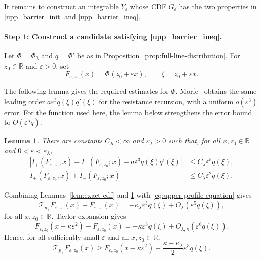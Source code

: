 \documentclass[12pt]{amsart}
\numberwithin{equation}{section}
\theoremstyle{plain}
\newtheorem{lemma}[theorem]{Lemma}
\theoremstyle{definition}
\newcommand{\R}{\mathbb R}
\begin{document}
It remains to construct an integrable $Y_\varepsilon$ whose CDF
$G_\varepsilon$ has the two properties in \eqref{upp_barrier_init}
and \eqref{upp_barrier_ineq}.

\paragraph*{Step 1: Construct a candidate satisfying \eqref{upp_barrier_ineq}.}
 Let
$\Phi=\Phi_{\lambda}$ and $q=\Phi'$ be as in
Proposition~\ref{prop:full-line-distribution}.  For $z_0\in\mathbb R$
and $\varepsilon>0$, set
\[
 F_{\varepsilon,z_0}(x)=\Phi(z_0+\varepsilon x),
 \qquad
 \xi=z_0+\varepsilon x.
\]

The following lemma gives the
required estimates for $\Phi$. Morfe~\cite[Proposition~10]{Morfe2026} obtains the same leading order $a\varepsilon^3q(\xi)q'(\xi)$ for the resistance recursion, with a  uniform $o(\varepsilon^3)$ error.  For the function used here, the lemma below strengthens the error bound to $O(\varepsilon^5q)$.
\begin{lemma}
\label{lem:weighted-consistency}
There are constants $C_\lambda<\infty$ and $\varepsilon_\lambda>0$
such that, for all $x,z_0\in\mathbb R$ and
$0<\varepsilon<\varepsilon_\lambda$,
\begin{align}
 \left|I_+(F_{\varepsilon,z_0};x)-I_-(F_{\varepsilon,z_0};x)
       -a\varepsilon^3q(\xi)q'(\xi)\right|
 &\le C_\lambda\varepsilon^5q(\xi),
 \label{eq:weighted-difference}\\
 I_+(F_{\varepsilon,z_0};x)+I_-(F_{\varepsilon,z_0};x)
 &\le C_\lambda\varepsilon^2q(\xi).
 \label{eq:weighted-sum}
\end{align}
\end{lemma}

Combining Lemmas~\ref{lem:exact-cdf} and
\ref{lem:weighted-consistency} with
\eqref{eq:upper-profile-equation} gives
\begin{equation*}
 \mathcal T_{p_+}F_{\varepsilon,z_0}(x)
 -F_{\varepsilon,z_0}(x)
 =-\kappa_{\lambda}\varepsilon^3q(\xi)
  +O_{\lambda}(\varepsilon^5q(\xi)),
\end{equation*}
for all $x,z_0\in\R$.  Taylor expansion gives
\begin{equation*}
 F_{\varepsilon,z_0}(x-\kappa\varepsilon^2)
 -F_{\varepsilon,z_0}(x)
 =-\kappa\varepsilon^3q(\xi)
  +O_{\lambda,\kappa}(\varepsilon^6q(\xi)).
\end{equation*}
Hence, for all sufficiently small $\varepsilon$ and all
$x,z_0\in\mathbb R$,
\begin{equation}
 \mathcal T_{p_+}F_{\varepsilon,z_0}(x)
 \ge F_{\varepsilon,z_0}(x-\kappa\varepsilon^2)
 +\frac{\kappa-\kappa_{\lambda}}{2}\varepsilon^3q(\xi).
 \label{eq:strict-untruncated-upper}
\end{equation}
\end{document}
